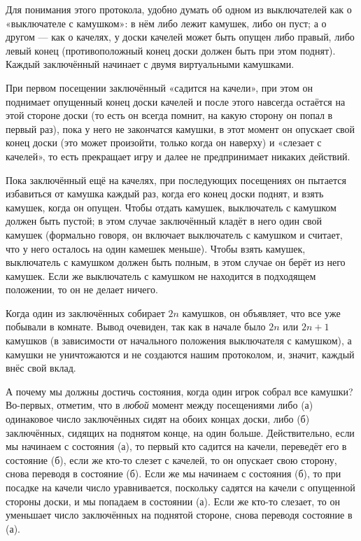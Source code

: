 \medskip

Для понимания этого протокола, удобно думать об одном из выключателей как о «выключателе с камушком»: в нём либо лежит камушек, либо он пуст; а о другом --- как о качелях, у доски качелей может быть опущен либо правый, либо  левый конец (противоположный конец доски должен быть при этом поднят).
Каждый заключённый начинает с двумя виртуальными камушками.

При первом посещении заключённый «садится на качели», при этом он поднимает опущенный конец доски качелей и
после этого навсегда остаётся на этой стороне доски (то есть он всегда помнит, на какую сторону он попал в первый раз), пока у него не закончатся камушки, в этот момент он опускает свой конец доски (это может произойти, только когда он наверху) и «слезает с качелей», то есть прекращает игру и далее не предпринимает никаких действий.

Пока заключённый ещё на качелях,
при последующих посещениях он пытается избавиться от камушка каждый раз, когда его конец доски поднят,
и взять камушек, когда он опущен.
Чтобы отдать камушек, выключатель с камушком должен быть пустой;
в этом случае заключённый 
кладёт в него один свой камушек (формально говоря, он включает выключатель с камушком и считает, что у него осталось на один камешек меньше).
Чтобы взять камушек, выключатель с камушком должен быть полным, в этом случае он берёт из него камушек.
Если же выключатель с камушком не находится в подходящем положении, то он не делает ничего.

Когда один из заключённых собирает $2n$ камушков, он объявляет, что все уже побывали в комнате.
Вывод очевиден, так как в начале было $2n$ или $2n+1$ камушков (в зависимости от начального положения выключателя с камушком), а камушки не уничтожаются и не создаются нашим протоколом, и, значит, каждый внёс свой вклад.

А почему мы должны достичь состояния, когда один игрок собрал все камушки?
Во-первых, отметим, что в \emph{любой} момент между посещениями либо 
(а) одинаковое число заключённых сидят на обоих концах доски, либо 
(б) заключённых, сидящих на поднятом конце, на один больше.
Действительно, если мы начинаем с состояния (а), то первый кто садится на качели, переведёт его в состояние (б), если же кто-то слезет с качелей, то он опускает свою сторону, снова переводя в состояние (б).
Если же мы начинаем с состояния (б), то при посадке на качели число уравнивается, поскольку садятся на качели с опущенной стороны доски, и мы попадаем в состоянии (а).
Если же кто-то слезает, то он уменьшает число заключённых на поднятой стороне, снова переводя состояние в (а).

